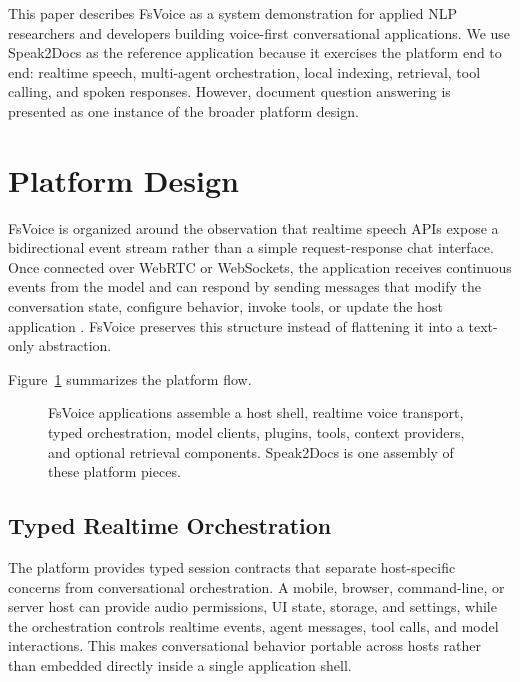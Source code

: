 \documentclass[11pt]{article}
\begin{document}
This paper describes FsVoice as a system demonstration for applied NLP researchers and developers building voice-first conversational applications. We use Speak2Docs as the reference application because it exercises the platform end to end: realtime speech, multi-agent orchestration, local indexing, retrieval, tool calling, and spoken responses. However, document question answering is presented as one instance of the broader platform design.

\section{Platform Design}

FsVoice is organized around the observation that realtime speech APIs expose a bidirectional event stream rather than a simple request-response chat interface. Once connected over WebRTC or WebSockets, the application receives continuous events from the model and can respond by sending messages that modify the conversation state, configure behavior, invoke tools, or update the host application \citep{openaiRealtime}. FsVoice preserves this structure instead of flattening it into a text-only abstraction.

Figure~\ref{fig:platform} summarizes the platform flow.

\begin{figure}[t]
  \centering
  \caption{FsVoice applications assemble a host shell, realtime voice transport, typed orchestration, model clients, plugins, tools, context providers, and optional retrieval components. Speak2Docs is one assembly of these platform pieces.}
  \label{fig:platform}
\end{figure}

\subsection{Typed Realtime Orchestration}

The platform provides typed session contracts that separate host-specific concerns from conversational orchestration. A mobile, browser, command-line, or server host can provide audio permissions, UI state, storage, and settings, while the orchestration controls realtime events, agent messages, tool calls, and model interactions. This makes conversational behavior portable across hosts rather than embedded directly inside a single application shell.
\end{document}
